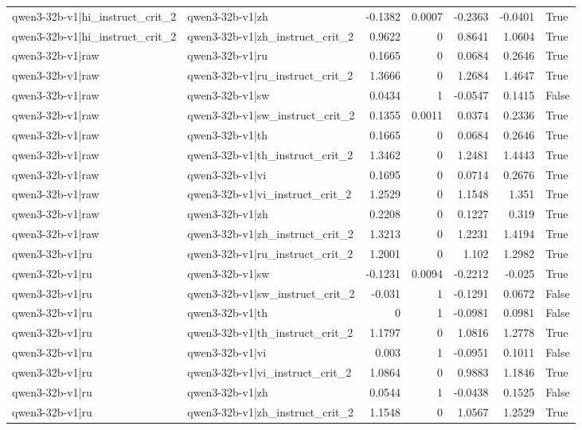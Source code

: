 \begin{table}
\begin{tabular}{l l r r r r l}
qwen3-32b-v1|hi_instruct_crit_2 & qwen3-32b-v1|zh & -0.1382 & 0.0007 & -0.2363 & -0.0401 & True \\
qwen3-32b-v1|hi_instruct_crit_2 & qwen3-32b-v1|zh_instruct_crit_2 & 0.9622 & 0 & 0.8641 & 1.0604 & True \\
qwen3-32b-v1|raw & qwen3-32b-v1|ru & 0.1665 & 0 & 0.0684 & 0.2646 & True \\
qwen3-32b-v1|raw & qwen3-32b-v1|ru_instruct_crit_2 & 1.3666 & 0 & 1.2684 & 1.4647 & True \\
qwen3-32b-v1|raw & qwen3-32b-v1|sw & 0.0434 & 1 & -0.0547 & 0.1415 & False \\
qwen3-32b-v1|raw & qwen3-32b-v1|sw_instruct_crit_2 & 0.1355 & 0.0011 & 0.0374 & 0.2336 & True \\
qwen3-32b-v1|raw & qwen3-32b-v1|th & 0.1665 & 0 & 0.0684 & 0.2646 & True \\
qwen3-32b-v1|raw & qwen3-32b-v1|th_instruct_crit_2 & 1.3462 & 0 & 1.2481 & 1.4443 & True \\
qwen3-32b-v1|raw & qwen3-32b-v1|vi & 0.1695 & 0 & 0.0714 & 0.2676 & True \\
qwen3-32b-v1|raw & qwen3-32b-v1|vi_instruct_crit_2 & 1.2529 & 0 & 1.1548 & 1.351 & True \\
qwen3-32b-v1|raw & qwen3-32b-v1|zh & 0.2208 & 0 & 0.1227 & 0.319 & True \\
qwen3-32b-v1|raw & qwen3-32b-v1|zh_instruct_crit_2 & 1.3213 & 0 & 1.2231 & 1.4194 & True \\
qwen3-32b-v1|ru & qwen3-32b-v1|ru_instruct_crit_2 & 1.2001 & 0 & 1.102 & 1.2982 & True \\
qwen3-32b-v1|ru & qwen3-32b-v1|sw & -0.1231 & 0.0094 & -0.2212 & -0.025 & True \\
qwen3-32b-v1|ru & qwen3-32b-v1|sw_instruct_crit_2 & -0.031 & 1 & -0.1291 & 0.0672 & False \\
qwen3-32b-v1|ru & qwen3-32b-v1|th & 0 & 1 & -0.0981 & 0.0981 & False \\
qwen3-32b-v1|ru & qwen3-32b-v1|th_instruct_crit_2 & 1.1797 & 0 & 1.0816 & 1.2778 & True \\
qwen3-32b-v1|ru & qwen3-32b-v1|vi & 0.003 & 1 & -0.0951 & 0.1011 & False \\
qwen3-32b-v1|ru & qwen3-32b-v1|vi_instruct_crit_2 & 1.0864 & 0 & 0.9883 & 1.1846 & True \\
qwen3-32b-v1|ru & qwen3-32b-v1|zh & 0.0544 & 1 & -0.0438 & 0.1525 & False \\
qwen3-32b-v1|ru & qwen3-32b-v1|zh_instruct_crit_2 & 1.1548 & 0 & 1.0567 & 1.2529 & True \\

\end{tabular}
\end{table}
